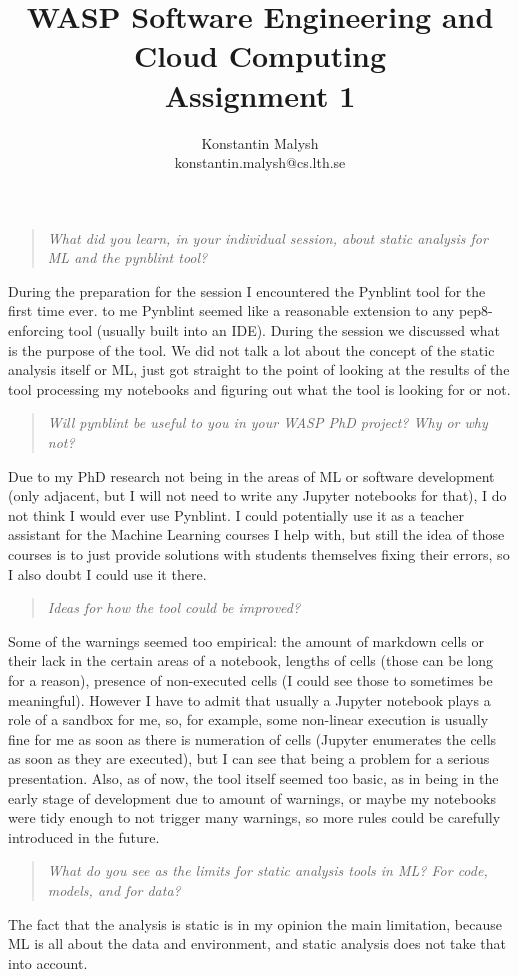 \documentclass{article}
\title{WASP Software Engineering and Cloud Computing\\Assignment 1}
\author{Konstantin Malysh\\konstantin.malysh@cs.lth.se}
\date{}
\begin{document}
 \maketitle

\begin{quote}\emph{What did you learn, in your individual session, about static analysis for ML and the pynblint tool?} \end{quote}
During the preparation for the session I encountered the Pynblint tool for the first time ever. to me Pynblint seemed like a reasonable extension to any pep8-enforcing tool (usually built into an IDE). During the session we discussed what is the purpose of the tool. We did not talk a lot about the concept of the static analysis itself or ML, just got straight to the point of looking at the results of the tool processing my notebooks and figuring out what the tool is looking for or not.

\begin{quote}\emph{Will pynblint be useful to you in your WASP PhD project? Why or why not?} \end{quote}
Due to my PhD research not being in the areas of ML or software development (only adjacent, but I will not need to write any Jupyter notebooks for that), I do not think I would ever use Pynblint. I could potentially use it as a teacher assistant for the Machine Learning courses I help with, but still the idea of those courses is to just provide solutions with students themselves fixing their errors, so I also doubt I could use it there.
\begin{quote}\emph{Ideas for how the tool could be improved?} \end{quote}
Some of the warnings seemed too empirical: the amount of markdown cells or their lack in the certain areas of a notebook, lengths of cells (those can be long for a reason), presence of non-executed cells (I could see those to sometimes be meaningful). However I have to admit that usually a Jupyter notebook plays a role of a sandbox for me, so, for example, some non-linear execution is usually fine for me as soon as there is numeration of cells (Jupyter enumerates the cells as soon as they are executed), but I can see that being a problem for a serious presentation.
Also, as of now, the tool itself seemed too basic, as in being in the early stage of development due to amount of warnings, or maybe my notebooks were tidy enough to not trigger many warnings, so more rules could be carefully introduced in the future.
\begin{quote}\emph{What do you see as the limits for static analysis tools in ML? For code, models, and for data?} \end{quote}
The fact that the analysis is static is in my opinion the main limitation, because ML is all about the data and environment, and static analysis does not take that into account.
\end{document}
